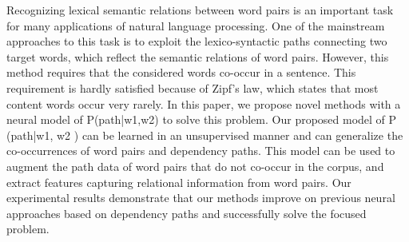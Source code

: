 Recognizing lexical semantic relations between word pairs is an important task for many applications of natural language processing. One of the mainstream approaches to this task is to exploit the lexico-syntactic paths connecting two target words, which reflect the semantic relations of word pairs. However, this method requires that the considered words co-occur in a sentence. This requirement is hardly satisfied because of Zipf's law, which states that most content words occur very rarely. In this paper, we propose novel methods with a neural model of P(path|w1,w2) to solve this problem. Our proposed model of P (path|w1, w2 ) can be learned in an unsupervised manner and can generalize the co-occurrences of word pairs and dependency paths. This model can be used to augment the path data of word pairs that do not co-occur in the corpus, and extract features capturing relational information from word pairs. Our experimental results demonstrate that our methods improve on previous neural approaches based on dependency paths and successfully solve the focused problem.
